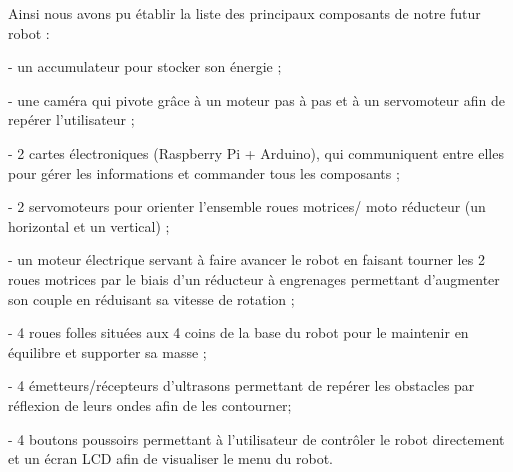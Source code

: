 \documentclass[12pt,a4paper]{article}
\begin{document}
\begin{center}
\end{center}

Ainsi nous avons pu établir la liste des principaux composants de notre futur robot :

- un accumulateur pour stocker son énergie ;

- une caméra qui pivote grâce à un moteur pas à pas et à un servomoteur afin de repérer l'utilisateur ;

- 2 cartes électroniques (Raspberry Pi + Arduino), qui communiquent entre elles pour gérer les informations et commander tous les composants ;

- 2 servomoteurs pour orienter l'ensemble roues motrices/ moto réducteur (un horizontal et un vertical) ;

- un moteur électrique servant à faire avancer le robot en faisant tourner les 2 roues motrices par le biais d'un réducteur à engrenages permettant d'augmenter son couple en réduisant sa vitesse de rotation ;

- 4 roues folles situées aux 4 coins de la base du robot pour le maintenir en équilibre et supporter sa masse ;

- 4 émetteurs/récepteurs d'ultrasons permettant de repérer les obstacles par réflexion de leurs ondes afin de les contourner;

- 4 boutons poussoirs permettant à l'utilisateur de contrôler le robot directement et un écran LCD afin de visualiser le menu du robot.
\end{document}
